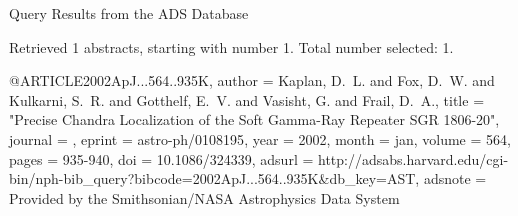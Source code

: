 Query Results from the ADS Database


Retrieved 1 abstracts, starting with number 1.  Total number selected: 1.

@ARTICLE{2002ApJ...564..935K,
   author = {{Kaplan}, D.~L. and {Fox}, D.~W. and {Kulkarni}, S.~R. and {Gotthelf}, E.~V. and 
	{Vasisht}, G. and {Frail}, D.~A.},
    title = "{Precise Chandra Localization of the Soft Gamma-Ray Repeater SGR 1806-20}",
  journal = {\apj},
   eprint = {astro-ph/0108195},
     year = 2002,
    month = jan,
   volume = 564,
    pages = {935-940},
      doi = {10.1086/324339},
   adsurl = {http://adsabs.harvard.edu/cgi-bin/nph-bib_query?bibcode=2002ApJ...564..935K&db_key=AST},
  adsnote = {Provided by the Smithsonian/NASA Astrophysics Data System}
}


